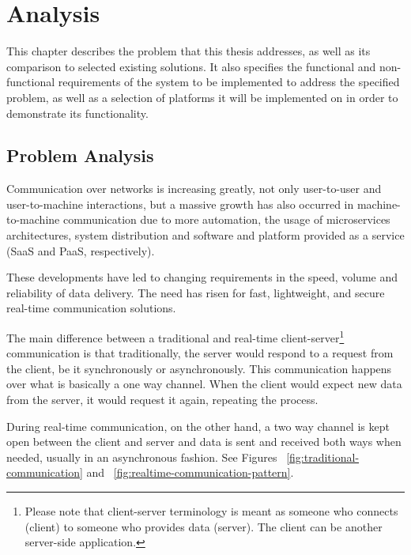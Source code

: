 \chapter{Analysis}\label{chap:analysis}

This chapter describes the problem that this thesis addresses, as well as its comparison to selected existing solutions. It also specifies the functional and non-functional requirements of the system to be implemented to address the specified problem, as well as a selection of platforms it will be implemented on in order to demonstrate its functionality.

\section{Problem Analysis}

Communication over networks is increasing greatly, not only user-to-user and user-to-machine interactions, but a massive growth has also occurred in machine-to-machine communication due to more automation, the usage of microservices architectures, system distribution and software and platform provided as a service (SaaS and PaaS, respectively).

These developments have led to changing requirements in the speed, volume and reliability of data delivery. The need has risen for fast, lightweight, and secure real-time communication solutions.

The main difference between a traditional and real-time client-server\footnote{Please note that client-server terminology is meant as someone who connects (client) to someone who provides data (server). The client can be another server-side application.} communication is that traditionally, the server would respond to a request from the client, be it synchronously or asynchronously. This communication happens over what is basically a one way channel. When the client would expect new data from the server, it would request it again, repeating the process.

During real-time communication, on the other hand, a two way channel is kept open between the client and server and data is sent and received both ways when needed, usually in an asynchronous fashion. See Figures ~\ref{fig:traditional-communication} and ~\ref{fig:realtime-communication-pattern}.

